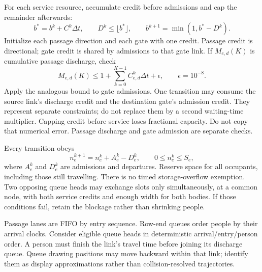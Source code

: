 \documentclass[11pt,a4paper]{article}
\begin{document}
For each service resource, accumulate credit before admissions and cap the remainder afterwards:
\begin{equation}\label{impl:eq10}
 b^*=b^k+C^k\Delta t,\qquad D^k\leq\lfloor b^*\rfloor,\qquad
 b^{k+1}=\min(1,b^*-D^k).
\end{equation}
Initialize each passage direction and each gate with one credit. Passage credit is directional; gate credit is shared by admissions to that gate link. If $M_{e,d}(K)$ is cumulative passage discharge, check
\begin{equation}
 M_{e,d}(K)\leq 1+\sum_{k=0}^{K-1}C_{e,d}^k\Delta t+\epsilon,
 \qquad \epsilon=10^{-8}.
\label{impl:service-bound}
\end{equation}
Apply the analogous bound to gate admissions. One transition may consume the source link's discharge credit and the destination gate's admission credit. They represent separate constraints; do not replace them by a second waiting-time multiplier. Capping credit before service loses fractional capacity. Do not copy that numerical error. Passage discharge and gate admission are separate checks.

Every transition obeys
\begin{equation}\label{impl:eq12}
 n_e^{k+1}=n_e^k+A_e^k-D_e^k,\qquad 0\leq n_e^k\leq S_e,
\end{equation}
where $A_e^k$ and $D_e^k$ are admissions and departures. Reserve space for all occupants, including those still travelling. There is no timed storage-overflow exemption. Two opposing queue heads may exchange slots only simultaneously, at a common node, with both service credits and enough width for both bodies. If those conditions fail, retain the blockage rather than shrinking people.

Passage lanes are FIFO by entry sequence. Row-end queues order people by their arrival clocks. Consider eligible queue heads in deterministic arrival/entry/person order. A person must finish the link's travel time before joining its discharge queue. Queue drawing positions may move backward within that link; identify them as display approximations rather than collision-resolved trajectories.
\end{document}
